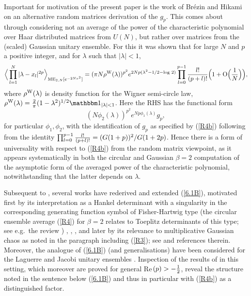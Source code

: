 \documentclass[11pt,a4paper]{article}
\numberwithin{equation}{section} %
\theoremstyle{plain}
\theoremstyle{definition}
\numberwithin{prop}{section}
\numberwithin{cor}{section}
\numberwithin{remark}{section}
\begin{document}
Important for motivation of the present paper is the work of Br\'ezin and Hikami \cite{BH00} on an alternative random matrices derivation of
the $g_p$. This comes about through considering not an average of the power of the characteristic polynomial
over Haar distributed matrices from $U(N)$, but rather over matrices from the
(scaled) Gaussian unitary ensemble. For this it was shown that 
for large $N$ and $p$ a positive integer, and for $\lambda$ such that $|\lambda| < 1$,
  \begin{equation}\label{6.1B}   
\Big \langle \prod_{l=1}^{N} |\lambda - x_l|^{2p} \Big \rangle_{{\rm ME}_{2,N}[e^{-2 N x^2}]} =
( \pi N \rho^{\rm W}(\lambda))^{p^2} e^{2Np( \lambda^2 - 1/2-\log \, 2)} \prod_{l=0}^{p-1} {l! \over (p + l)!} \Big ( 1 + {\rm O} \Big ( {1 \over N}  \Big )\Big ),
   \end{equation} 
   where $\rho^{\rm W}(\lambda)$ is density function for the Wigner semi-circle law, $\rho^{\rm W}(\lambda) = {2 \over \pi} (1 - \lambda^2)^{1/2} \mathbbm 1_{|\lambda|<1}$.
Here the RHS has the functional form 
\begin{equation}\label{S1a}
(N \phi_2(\lambda))^{p^2} e^{Np \phi_1(\lambda)} g_p,
\end{equation} 
for particular $\phi_1, \phi_2$, with the identification of $g_p$ as specified by (\ref{R4b})
following from the identity
 $ \prod_{l=0}^{p-1} {l! \over (p + l)!}  = (G(1+p))^2/G(1+2p)$. Hence there is a form of universality with respect to (\ref{R4b}) from the random matrix viewpoint,
 as it appears systematically in both the circular and Gaussian $\beta = 2$ computation of the asymptotic form of the averaged power of the characteristic polynomial, notwithstanding
that the latter depends on $\lambda$. 

Subsequent to  \cite{BH00}, 
 several works have rederived and extended (\ref{6.1B}), 
motivated first by its interpretation as a Hankel determinant with a singularity in the corresponding generating function symbol of Fisher-Hartwig type
(the circular ensemble average (\ref{R4}) for $\beta = 2$ relates to Toeplitz determinants of this type; see e.g.~the review \cite{Kr11})
\cite[Eq.~(21) with $m=1$, after minor correction]{Ga05},
 \cite[Th.~1 with $m=1$]{Kr07}, \cite{Ch19},
and later by
its relevance to multiplicative Gaussian chaos as noted in the paragraph including (\ref{R3}); see \cite{Fo23t} and references therein.
Moreover, the analogue of (\ref{6.1B}) (and generalisations) have been considered for the Laguerre and Jacobi unitary
 ensembles \cite{CG21}. Inspection of the results of \cite{CG21} in this setting, which moreover are proved  for general Re$\, (p) > - {1 \over 2}$, reveal the structure noted in the sentence below (\ref{6.1B}) and thus in particular with (\ref{R4b}) as a distinguished factor. 
\end{document}
